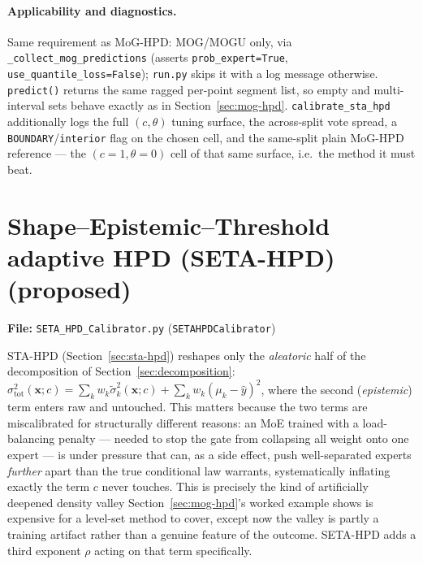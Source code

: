 \documentclass[11pt]{article}
\begin{document}
\paragraph{Applicability and diagnostics.} Same requirement as MoG-HPD: MOG/MOGU only, via
\texttt{\_collect\_mog\_predictions} (asserts \texttt{prob\_expert=True},
\texttt{use\_quantile\_loss=False}); \texttt{run.py} skips it with a log message otherwise.
\texttt{predict()} returns the same ragged per-point segment list, so empty and multi-interval sets
behave exactly as in Section~\ref{sec:mog-hpd}. \texttt{calibrate\_sta\_hpd} additionally logs
the full $(c,\theta)$ tuning surface, the across-split vote spread, a
\texttt{BOUNDARY}/\texttt{interior} flag on the chosen cell, and the same-split plain MoG-HPD
reference --- the $(c{=}1,\theta{=}0)$ cell of that same surface, i.e.\ the method it must beat.

\section{Shape--Epistemic--Threshold adaptive HPD (SETA-HPD) (proposed)}
\label{sec:seta-hpd}
\textbf{File:} \texttt{SETA\_HPD\_Calibrator.py} (\texttt{SETAHPDCalibrator})

STA-HPD (Section~\ref{sec:sta-hpd}) reshapes only the \emph{aleatoric} half of the
decomposition of Section~\ref{sec:decomposition}: $\sigma_{\mathrm{tot}}^2(\bm x;c) =
\sum_k w_k\tilde\sigma_k^2(\bm x;c) + \sum_k w_k(\mu_k-\hat y)^2$, where the second
(\emph{epistemic}) term enters raw and untouched. This matters because the two terms are
miscalibrated for structurally different reasons: an MoE trained with a load-balancing penalty
--- needed to stop the gate from collapsing all weight onto one expert --- is under pressure
that can, as a side effect, push well-separated experts \emph{further} apart than the true
conditional law warrants, systematically inflating exactly the term $c$ never touches. This is
precisely the kind of artificially deepened density valley Section~\ref{sec:mog-hpd}'s worked
example shows is expensive for a level-set method to cover, except now the valley is partly a
training artifact rather than a genuine feature of the outcome. SETA-HPD adds a third exponent
$\rho$ acting on that term specifically.
\end{document}
